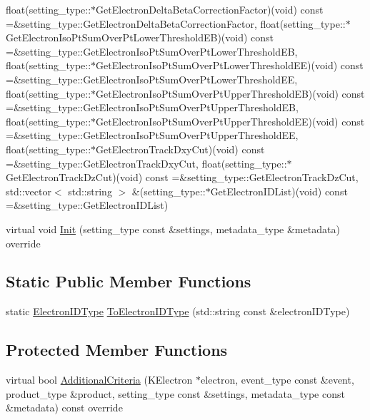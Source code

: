 \begin{DoxyCompactItemize}
float(setting\_\-type::$\ast$GetElectronDeltaBetaCorrectionFactor)(void) const =\&setting\_\-type::GetElectronDeltaBetaCorrectionFactor, float(setting\_\-type::$\ast$GetElectronIsoPtSumOverPtLowerThresholdEB)(void) const =\&setting\_\-type::GetElectronIsoPtSumOverPtLowerThresholdEB, float(setting\_\-type::$\ast$GetElectronIsoPtSumOverPtLowerThresholdEE)(void) const =\&setting\_\-type::GetElectronIsoPtSumOverPtLowerThresholdEE, float(setting\_\-type::$\ast$GetElectronIsoPtSumOverPtUpperThresholdEB)(void) const =\&setting\_\-type::GetElectronIsoPtSumOverPtUpperThresholdEB, float(setting\_\-type::$\ast$GetElectronIsoPtSumOverPtUpperThresholdEE)(void) const =\&setting\_\-type::GetElectronIsoPtSumOverPtUpperThresholdEE, float(setting\_\-type::$\ast$GetElectronTrackDxyCut)(void) const =\&setting\_\-type::GetElectronTrackDxyCut, float(setting\_\-type::$\ast$GetElectronTrackDzCut)(void) const =\&setting\_\-type::GetElectronTrackDzCut, std::vector$<$ std::string $>$ \&(setting\_\-type::$\ast$GetElectronIDList)(void) const =\&setting\_\-type::GetElectronIDList)
\item 
virtual void \hyperlink{classHttValidElectronsProducer_ae10e80f0e540bbf1d1e85a141b530bd7}{Init} (setting\_\-type const \&settings, metadata\_\-type \&metadata) override
\end{DoxyCompactItemize}
\subsection*{Static Public Member Functions}
\begin{DoxyCompactItemize}
\item 
static \hyperlink{classHttValidElectronsProducer_ad4e8f1361e437e197126f52a538578d3}{ElectronIDType} \hyperlink{classHttValidElectronsProducer_a4280849eaeb101017cbe0a49d4b68311}{ToElectronIDType} (std::string const \&electronIDType)
\end{DoxyCompactItemize}
\subsection*{Protected Member Functions}
\begin{DoxyCompactItemize}
\item 
virtual bool \hyperlink{classHttValidElectronsProducer_aba4230bf7a962a9a18a03433aaa3d3ec}{AdditionalCriteria} (KElectron $\ast$electron, event\_\-type const \&event, product\_\-type \&product, setting\_\-type const \&settings, metadata\_\-type const \&metadata) const override
\end{DoxyCompactItemize}


